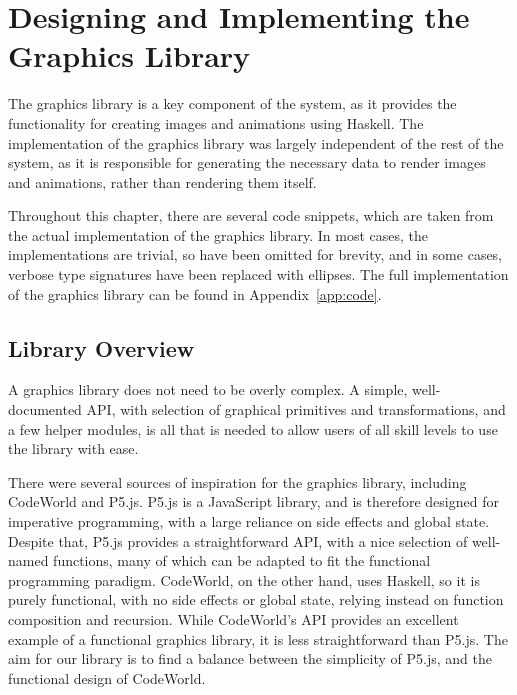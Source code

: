 \documentclass[../main.tex]{subfiles}
\begin{document}
\chapter{Designing and Implementing the Graphics Library} \label{ch:graphics}
    The graphics library is a key component of the system, as it provides the
        functionality for creating images and animations using Haskell.
    The implementation of the graphics library was largely independent of the rest
        of the system, as it is responsible for generating the necessary data to render
        images and animations, rather than rendering them itself.

    Throughout this chapter, there are several code snippets, which are taken from
        the actual implementation of the graphics library.
    In most cases, the implementations are trivial, so have been omitted for
        brevity, and in some cases, verbose type signatures have been replaced with
        ellipses.
    The full implementation of the graphics library can be found in
        Appendix~\ref{app:code}.

    \section{Library Overview}
        A graphics library does not need to be overly complex.
        A simple, well-documented API, with selection of graphical primitives and
            transformations, and a few helper modules, is all that is needed to allow users
            of all skill levels to use the library with ease.

        There were several sources of inspiration for the graphics library, including
            CodeWorld and P5.js.
        P5.js is a JavaScript library, and is therefore designed for imperative
            programming, with a large reliance on side effects and global state.
        Despite that, P5.js provides a straightforward API, with a nice selection of
            well-named functions, many of which can be adapted to fit the functional
            programming paradigm.
        CodeWorld, on the other hand, uses Haskell, so it is purely functional, with no
            side effects or global state, relying instead on function composition and
            recursion.
        While CodeWorld's API provides an excellent example of a functional graphics
            library, it is less straightforward than P5.js.
        The aim for our library is to find a balance between the simplicity of P5.js,
            and the functional design of CodeWorld.
\end{document}
